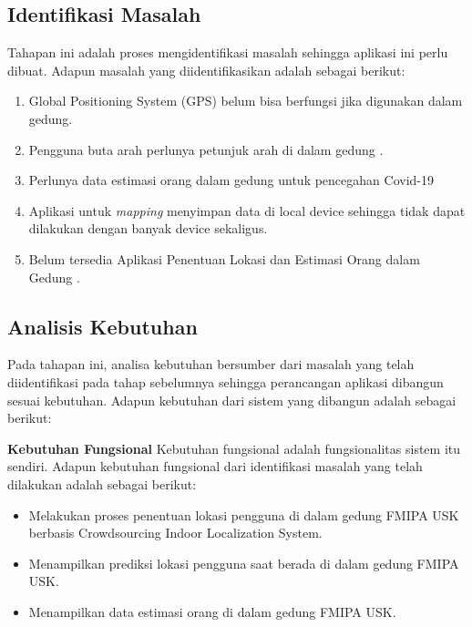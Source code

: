 \fancyhf{}
\fancyfoot[R]{\thepage}

\subsection{Identifikasi Masalah}
Tahapan ini adalah proses mengidentifikasi masalah sehingga aplikasi ini perlu dibuat. Adapun masalah yang diidentifikasikan adalah sebagai berikut:
\begin{enumerate}[1.]
	\itemsep0em
	\item Global Positioning System (GPS) belum bisa berfungsi jika digunakan dalam gedung.
	\item Pengguna buta arah perlunya petunjuk arah di dalam gedung
	      \citep{Keluza2017}.
	\item Perlunya data estimasi orang dalam gedung untuk pencegahan Covid-19
	\item Aplikasi untuk \textit{mapping} menyimpan data di local device sehingga tidak dapat dilakukan dengan banyak device sekaligus.
	\item Belum tersedia Aplikasi Penentuan Lokasi dan Estimasi Orang dalam Gedung .
\end{enumerate}

\subsection{Analisis Kebutuhan}
Pada tahapan ini, analisa kebutuhan bersumber dari masalah yang telah diidentifikasi pada tahap sebelumnya sehingga perancangan aplikasi dibangun sesuai kebutuhan. Adapun kebutuhan dari sistem yang dibangun adalah sebagai berikut:

\par \textbf{Kebutuhan Fungsional} Kebutuhan fungsional adalah fungsionalitas sistem itu sendiri. Adapun kebutuhan fungsional dari identifikasi masalah yang telah dilakukan adalah sebagai berikut:

\begin{itemize}
	\item Melakukan proses penentuan lokasi pengguna di dalam gedung FMIPA USK berbasis Crowdsourcing Indoor Localization System.

	\item Menampilkan prediksi lokasi pengguna saat berada di dalam gedung FMIPA USK.

	\item Menampilkan data estimasi orang di dalam gedung FMIPA USK.

\end{itemize}

